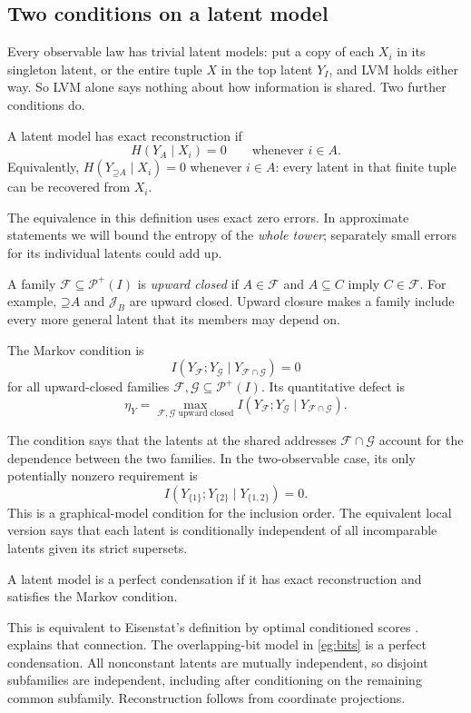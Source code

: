 \documentclass[11pt]{article}
\newcommand{\PI}{\mathcal{P}^{+}(I)}
\newcommand{\Up}{\mathord{\supseteq}}
\begin{document}
\subsection{Two conditions on a latent model}
\label{sec:conditions}
Every observable law has trivial latent models: put a copy of each $X_i$ in its
singleton latent, or the entire tuple $X$ in the top latent $Y_I$, and LVM
holds either way. So LVM alone says nothing about how information is shared.
Two further conditions do.

\begin{definition}[Reconstruction]
\label{def:reconstruction}
A latent model has exact reconstruction if
\[
 H(Y_A\mid X_i)=0\qquad\text{whenever }i\in A.
\]
Equivalently, $H(Y_{\Up A}\mid X_i)=0$ whenever $i\in A$: every latent
in that finite tuple can be recovered from $X_i$.
\end{definition}

The equivalence in this definition uses exact zero errors. In approximate
statements we will bound the entropy of the \emph{whole tower}; separately small
errors for its individual latents could add up.

A family $\mathcal{F}\subseteq\PI$ is \emph{upward closed} if
$A\in\mathcal{F}$ and $A\subseteq C$ imply $C\in\mathcal{F}$.
For example, $\Up A$ and $\mathcal{J}_B$ are upward closed. Upward closure
makes a family include every more general latent that its members may depend
on.

\begin{definition}
\label{def:markov}
The Markov condition is
\[
 I(Y_{\mathcal{F}};Y_{\mathcal{G}}\mid
 Y_{\mathcal{F}\cap\mathcal{G}})=0
\]
for all upward-closed families $\mathcal{F},\mathcal{G}\subseteq\PI$.
Its quantitative defect is
\[
 \eta_Y=\max_{\mathcal{F},\mathcal{G}\text{ upward closed}}
 I(Y_{\mathcal{F}};Y_{\mathcal{G}}\mid Y_{\mathcal{F}\cap\mathcal{G}}).
\]
\end{definition}

The condition says that the latents at the shared addresses
$\mathcal{F}\cap\mathcal{G}$ account for the dependence between the two
families. In the two-observable
case, its only potentially nonzero requirement is
\[
 I(Y_{\{1\}};Y_{\{2\}}\mid Y_{\{1,2\}})=0.
\]
This is a graphical-model condition for the inclusion order. The equivalent
local version says that each latent is conditionally independent of all
incomparable latents given its strict supersets.

\begin{definition}
\label{def:perfect}
A latent model is a perfect condensation if it has exact reconstruction
and satisfies the Markov condition.
\end{definition}
This is equivalent to Eisenstat's definition by optimal conditioned scores
\citep[Theorem~5.10]{eisenstat2025condensation}.  explains that connection.
The overlapping-bit model in \cref{eg:bits} is a perfect condensation. All
nonconstant latents are mutually independent, so disjoint subfamilies are
independent, including after conditioning on the remaining common
subfamily. Reconstruction follows from coordinate projections.
\end{document}
